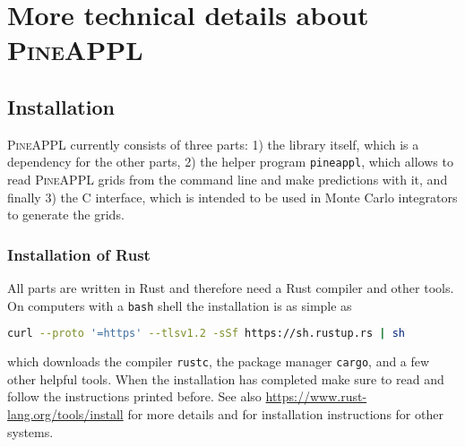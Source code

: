 \section{More technical details about \texorpdfstring{\textsc{PineAPPL}}{PineAPPL}}

%

\subsection{Installation}
\label{app:installation}

\textsc{PineAPPL} currently consists of three parts: 1) the library itself, which is a dependency for the other parts, 2) the helper program \texttt{pineappl}, which allows to read \textsc{PineAPPL} grids from the command line and make predictions with it, and finally 3) the C interface, which is intended to be used in Monte Carlo integrators to generate the grids.

\subsubsection*{Installation of Rust}


All parts are written in Rust and therefore need a Rust compiler and other tools.
On computers with a \texttt{bash} shell the installation is as simple as
\begin{lstlisting}[language=bash]
curl --proto '=https' --tlsv1.2 -sSf https://sh.rustup.rs | sh
\end{lstlisting}
which downloads the compiler \texttt{rustc}, the package manager \texttt{cargo}, and a few other helpful tools.
When the installation has completed make sure to read and follow the instructions printed before.
See also \url{https://www.rust-lang.org/tools/install} for more details and for installation instructions for other systems.

